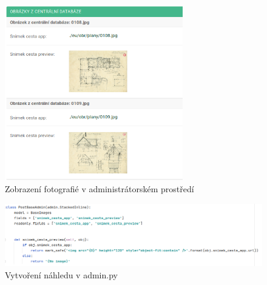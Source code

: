 \begin{figure}[H] \centering
    \includegraphics[width=220pt]{./pictures/24-nahled-obrazku.PNG}
    \caption[Zobrazení fotografié v administrátorském prostředí]{Zobrazení fotografié v administrátorském prostředí}
	\label{fig:Zobrazení fotografié v administrátorském prostředí}              
\end{figure}

\begin{figure}[H] \centering
    \includegraphics[width=450pt]{./pictures/25-vytvoreni-nahledu.PNG}
    \caption[Vytvoření náhledu v admin.py]{Vytvoření náhledu v admin.py}
	\label{fig:Vytvoření náhledu v admin.py}              
\end{figure}





































